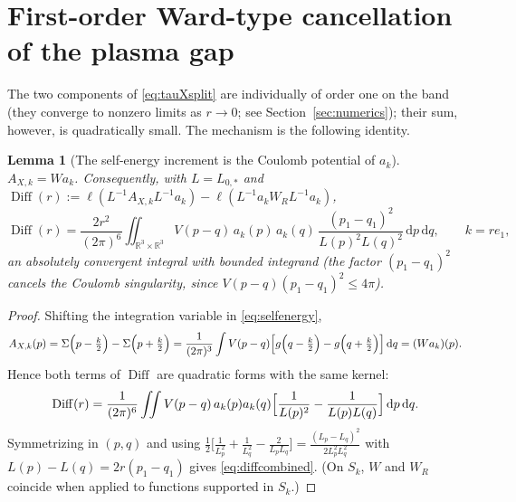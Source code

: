 \documentclass[11pt,a4paper]{amsart}
\newtheorem{lemma}[theorem]{Lemma}
\theoremstyle{definition}
\theoremstyle{remark}
\newcommand{\R}{\mathbb{R}}
\newcommand{\dd}{\,\mathrm{d}}
\newcommand{\ellf}{\ell}
\begin{document}
\section{First-order Ward-type cancellation of the plasma gap}\label{sec:ward}

The two components of \eqref{eq:tauXsplit} are individually of order one on the band (they converge to nonzero limits as $r\to0$; see Section~\ref{sec:numerics}); their sum, however, is quadratically small. The mechanism is the following identity.

\begin{lemma}[The self-energy increment is the Coulomb potential of $a_k$]\label{lem:AXident}
$A_{X,k}=W a_k$. Consequently, with $L=L_{0,*}$ and $\operatorname{Diff}(r):=\ellf(L^{-1}A_{X,k}L^{-1}a_k)-\ellf(L^{-1}a_kW_RL^{-1}a_k)$,
\begin{equation}\label{eq:diffcombined}
\operatorname{Diff}(r)=\frac{2r^2}{(2\pi)^6}\iint_{\R^3\times\R^3}
V(p-q)\,a_k(p)\,a_k(q)\,\frac{(p_1-q_1)^2}{L(p)^2L(q)^2}\dd p\dd q ,
\qquad k=re_1 ,
\end{equation}
an absolutely convergent integral with bounded integrand \textup{(}the factor $(p_1-q_1)^2$ cancels the Coulomb singularity, since $V(p-q)(p_1-q_1)^2\le4\pi$\textup{)}.
\end{lemma}

\begin{proof}
Shifting the integration variable in \eqref{eq:selfenergy},
\[
A_{X,k}(p)=\Sigma\Bigl(p-\tfrac k2\Bigr)-\Sigma\Bigl(p+\tfrac k2\Bigr)
=\frac{1}{(2\pi)^3}\int V(p-q)\Bigl[g\Bigl(q-\tfrac k2\Bigr)-g\Bigl(q+\tfrac k2\Bigr)\Bigr]\dd q=(Wa_k)(p).
\]
Hence both terms of $\operatorname{Diff}$ are quadratic forms with the same kernel:
\[
\operatorname{Diff}(r)=\frac{1}{(2\pi)^6}\iint V(p-q)\,a_k(p)a_k(q)\Bigl[\frac1{L(p)^2}-\frac1{L(p)L(q)}\Bigr]\dd p\dd q .
\]
Symmetrizing in $(p,q)$ and using $\frac12\bigl[\frac1{L_p^2}+\frac1{L_q^2}-\frac2{L_pL_q}\bigr]=\frac{(L_p-L_q)^2}{2L_p^2L_q^2}$ with $L(p)-L(q)=2r(p_1-q_1)$ gives \eqref{eq:diffcombined}. (On $S_k$, $W$ and $W_R$ coincide when applied to functions supported in $S_k$.)
\end{proof}
\end{document}
